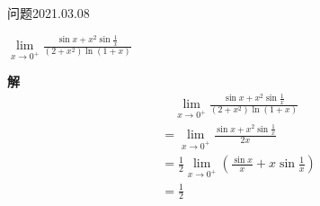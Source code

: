 \begin{mybox}{问题2021.03.08}
	
	\qquad $\lim\limits_{x \to 0^+}\frac{\sin x +x^2\sin \frac{1}{x}}{(2+x^2)\ln (1+x)}$
\end{mybox}
\noindent
\textbf{解}
\begin{align*}
	&\quad\lim\limits_{x \to 0^+}\frac{\sin x +x^2\sin \frac{1}{x}}{(2+x^2)\ln (1+x)}\\
	&=\lim \limits_{x\to 0^+} \frac{\sin x+x^2\sin \frac{1}{x}}{2x}\\
	&=\frac{1}{2}\lim \limits_{x \to 0^+} (\frac{\sin x}{x}+x\sin \frac{1}{x})\\
	&=\frac{1}{2}
\end{align*}